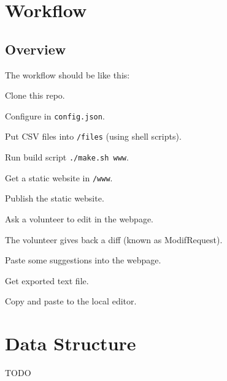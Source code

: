 \documentclass[11pt,a4paper]{report}
\begin{document}
\chapter{Workflow}

\section{Overview}
The workflow should be like this:
\begin{compactitem}
    \item Clone this repo.
    \item Configure in \texttt{config.json}.
    \item Put CSV files into \texttt{/files} (using shell scripts).
    \item Run build script \texttt{./make.sh www}.
    \item Get a static website in \texttt{/www}.
    \item Publish the static website.
    \item Ask a volunteer to edit in the webpage.
    \item The volunteer gives back a diff (known as ModifRequest).
    \item Paste some suggestions into the webpage.
    \item Get exported text file.
    \item Copy and paste to the local editor.
\end{compactitem}






\chapter{Data Structure}
TODO
\end{document}
